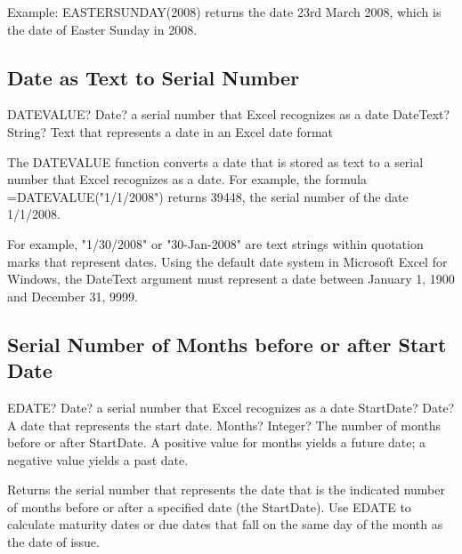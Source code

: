 \vspace{0.3cm}
Example: EASTERSUNDAY(2008) returns the date 23rd March 2008, which is the date of Easter Sunday in 2008. 






\subsection{Date as Text to Serial Number}

\begin{mpFunctionsExtract}
	\mpWorksheetFunctionOneNotImplemented
	{DATEVALUE? Date? a serial number that Excel recognizes as a date}
	{DateText? String? Text that represents a date in an Excel date format}
\end{mpFunctionsExtract}

\vspace{0.3cm}
The DATEVALUE function converts a date that is stored as text to a serial number that Excel recognizes as a date. For example, the formula =DATEVALUE("1/1/2008") returns 39448, the serial number of the date 1/1/2008.

For example, "1/30/2008" or "30-Jan-2008" are text strings within quotation marks that represent dates. 
Using the default date system in Microsoft Excel for Windows, the DateText argument must represent a date between January 1, 1900 and December 31, 9999.





\subsection{Serial Number of Months before or after Start Date}

\begin{mpFunctionsExtract}
	\mpWorksheetFunctionTwoNotImplemented
	{EDATE? Date? a serial number that Excel recognizes as a date}
	{StartDate? Date? A date that represents the start date.}
	{Months? Integer? The number of months before or after StartDate. A positive value for months yields a future date; a negative value yields a past date.}
\end{mpFunctionsExtract}

\vspace{0.3cm}
Returns the serial number that represents the date that is the indicated number of months before or after a specified date (the StartDate). Use EDATE to calculate maturity dates or due dates that fall on the same day of the month as the date of issue.

